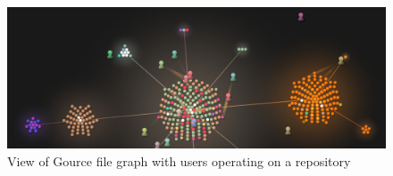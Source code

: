 \begin{figure}[htpb]
  \centering
  \includegraphics[width=0.8\linewidth]{./Figures/introduction/gource-linux.jpg}
  \caption{View of Gource file graph with users operating on a
    repository}
  \label{fig:gource_view}
\end{figure}
